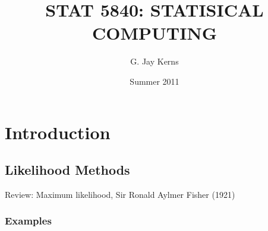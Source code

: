 \documentclass[captions=tableheading]{scrbook}
\title{\fontsize{30}{35}\selectfont STAT 5840: STATISICAL COMPUTING}
\author{G. Jay Kerns}
\date{Summer 2011}
\begin{document}
\maketitle




\chapter{Introduction}
\label{sec-1}
\section{Likelihood Methods}
\label{sec-1_1}


Review: Maximum likelihood, Sir Ronald Aylmer Fisher (1921)
\subsection{Examples}
\label{sec-1_1_1}
\end{document}
